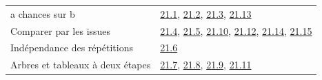 \begin{tabularx}{\linewidth}{@{}Yl@{}}\toprule
a chances sur b & \hyperref[exo-21-1]{21.1}, \hyperref[exo-21-2]{21.2}, \hyperref[exo-21-3]{21.3}, \hyperref[exo-21-13]{21.13}\\[2mm]
Comparer par les issues & \hyperref[exo-21-4]{21.4}, \hyperref[exo-21-5]{21.5}, \hyperref[exo-21-10]{21.10}, \hyperref[exo-21-12]{21.12}, \hyperref[exo-21-14]{21.14}, \hyperref[exo-21-15]{21.15}\\[2mm]
Indépendance des répétitions & \hyperref[exo-21-6]{21.6}\\[2mm]
Arbres et tableaux à deux étapes & \hyperref[exo-21-7]{21.7}, \hyperref[exo-21-8]{21.8}, \hyperref[exo-21-9]{21.9}, \hyperref[exo-21-11]{21.11}\\[2mm]
\bottomrule\end{tabularx}\par\vspace{4mm}
\clearpage
